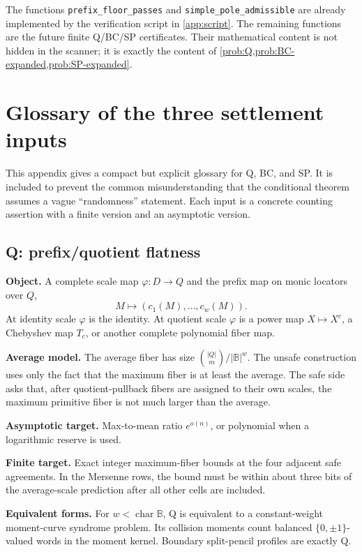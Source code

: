 \documentclass[11pt]{article}
\theoremstyle{definition}
\theoremstyle{remark}
\newcommand{\BB}{\mathbb B}
\begin{document}
The functions \texttt{prefix\_floor\_passes} and \texttt{simple\_pole\_admissible} are already implemented by the verification script in \cref{app:script}.  The remaining functions are the future finite Q/BC/SP certificates.  Their mathematical content is not hidden in the scanner; it is exactly the content of \cref{prob:Q,prob:BC-expanded,prob:SP-expanded}.


\section{Glossary of the three settlement inputs}\label{app:input-glossary}

This appendix gives a compact but explicit glossary for Q, BC, and SP.  It is included to prevent the common misunderstanding that the conditional theorem assumes a vague ``randomness'' statement.  Each input is a concrete counting assertion with a finite version and an asymptotic version.

\subsection*{Q: prefix/quotient flatness}

\textbf{Object.}  A complete scale map \(\varphi:D\to Q\) and the prefix map on monic locators over \(Q\),
\[
        M\longmapsto (c_1(M),\ldots,c_w(M)).
\]
At identity scale \(\varphi\) is the identity.  At quotient scale \(\varphi\) is a power map \(X\mapsto X^c\), a Chebyshev map \(T_c\), or another complete polynomial fiber map.

\textbf{Average model.}  The average fiber has size \(\binom{|Q|}{m}/|\BB|^w\).  The unsafe construction uses only the fact that the maximum fiber is at least the average.  The safe side asks that, after quotient-pullback fibers are assigned to their own scales, the maximum primitive fiber is not much larger than the average.

\textbf{Asymptotic target.}  Max-to-mean ratio \(e^{o(n)}\), or polynomial when a logarithmic reserve is used.

\textbf{Finite target.}  Exact integer maximum-fiber bounds at the four adjacent safe agreements.  In the Mersenne rows, the bound must be within about three bits of the average-scale prediction after all other cells are included.

\textbf{Equivalent forms.}  For \(w<\operatorname{char}\BB\), Q is equivalent to a constant-weight moment-curve syndrome problem.  Its collision moments count balanced \(\{0,\pm1\}\)-valued words in the moment kernel.  Boundary split-pencil profiles are exactly Q.
\end{document}
